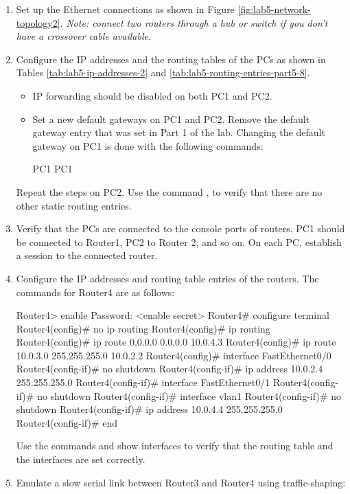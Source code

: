 \begin{enumerate}
	\item Set up the Ethernet connections as shown in Figure \ref{fig:lab5-network-topology2}. \emph{Note: connect two routers through a hub or switch if you don't have a crossover cable available.}
	\item Configure the IP addresses and the routing tables of the PCs as shown in Tables \ref{tab:lab5-ip-addresses-2} and \ref{tab:lab5-routing-entries-part5-8}.
		\begin{itemize}
			\item IP forwarding should be disabled on both PC1 and PC2.
			\item Set a new default gateways on PC1 and PC2. Remove the default gateway entry that was set in Part 1 of the lab. Changing the default gateway on PC1 is done with the following commands:
				\begin{cmdblock}
	PC1%
	PC1%
				\end{cmdblock}
		\end{itemize}
		Repeat the steps on PC2. Use the command , to verify that there are no other static routing entries.
	\item Verify that the PCs are connected to the console ports of routers. PC1 should be connected to Router1, PC2 to Router 2, and so on. On each PC, establish a  session to the connected router.
	\item Configure the IP addresses and routing table entries of the routers. The commands for Router4 are as follows:
		\begin{cmdblock}
	Router4> enable
	Password: <enable secret>
	Router4# configure terminal
	Router4(config)# no ip routing
	Router4(config)# ip routing
	Router4(config)# ip route 0.0.0.0 0.0.0.0 10.0.4.3 
	Router4(config)# ip route 10.0.3.0 255.255.255.0 10.0.2.2 
	Router4(config)# interface FastEthernet0/0 
	Router4(config-if)# no shutdown
	Router4(config-if)# ip address 10.0.2.4 255.255.255.0 
	Router4(config-if)# interface FastEthernet0/1
	Router4(config-if)# no shutdown
	Router4(config-if)# interface vlan1
	Router4(config-if)# no shutdown
	Router4(config-if)# ip address 10.0.4.4 255.255.255.0
	Router4(config-if)# end
		\end{cmdblock}
		Use the commands  and show interfaces to verify that the routing table and the interfaces are set correctly.
	\item Emulate a slow serial link between Router3 and Router4 using traffic-shaping:

\end{enumerate}
